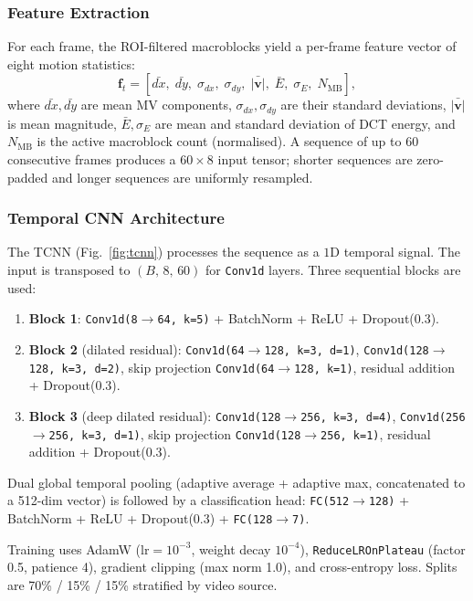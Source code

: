 \documentclass[conference]{IEEEtran}
\begin{document}
\subsubsection{Feature Extraction}
For each frame, the ROI-filtered macroblocks yield a per-frame feature vector of eight motion statistics:
\begin{equation}
\mathbf{f}_t = [\bar{dx},\; \bar{dy},\; \sigma_{dx},\; \sigma_{dy},\; \bar{|\mathbf{v}|},\; \bar{E},\; \sigma_E,\; N_{\text{MB}}],
\end{equation}
where $\bar{dx}, \bar{dy}$ are mean MV components, $\sigma_{dx}, \sigma_{dy}$ are their standard deviations, $\bar{|\mathbf{v}|}$ is mean magnitude, $\bar{E}, \sigma_E$ are mean and standard deviation of DCT energy, and $N_{\text{MB}}$ is the active macroblock count (normalised). A sequence of up to 60 consecutive frames produces a $60\!\times\!8$ input tensor; shorter sequences are zero-padded and longer sequences are uniformly resampled.

\subsubsection{Temporal CNN Architecture}
The TCNN (Fig.~\ref{fig:tcnn}) processes the sequence as a $1$D temporal signal. The input is transposed to $(B,\,8,\,60)$ for \texttt{Conv1d} layers. Three sequential blocks are used:

\begin{enumerate}
  \item \textbf{Block 1}: \texttt{Conv1d(8$\to$64, k=5)} + BatchNorm + ReLU + Dropout(0.3).
  \item \textbf{Block 2} (dilated residual): \texttt{Conv1d(64$\to$128, k=3, d=1)}, \texttt{Conv1d(128$\to$128, k=3, d=2)}, skip projection \texttt{Conv1d(64$\to$128, k=1)}, residual addition + Dropout(0.3).
  \item \textbf{Block 3} (deep dilated residual): \texttt{Conv1d(128$\to$256, k=3, d=4)}, \texttt{Conv1d(256$\to$256, k=3, d=1)}, skip projection \texttt{Conv1d(128$\to$256, k=1)}, residual addition + Dropout(0.3).
\end{enumerate}

Dual global temporal pooling (adaptive average + adaptive max, concatenated to a 512-dim vector) is followed by a classification head: \texttt{FC(512$\to$128)} + BatchNorm + ReLU + Dropout(0.3) + \texttt{FC(128$\to$7)}.

Training uses AdamW ($\text{lr} = 10^{-3}$, weight decay $10^{-4}$), \texttt{ReduceLROnPlateau} (factor 0.5, patience 4), gradient clipping (max norm 1.0), and cross-entropy loss. Splits are 70\% / 15\% / 15\% stratified by video source.
\end{document}
